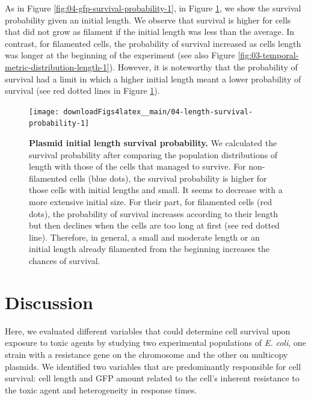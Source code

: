 \documentclass[a4paper, nobind]{templates/ociamthesis}
\begin{document}
As in Figure \ref{fig:04-gfp-survival-probability-1}, in Figure \ref{fig:04-length-survival-probability-1}, we show the survival probability given an initial length.
We observe that survival is higher for cells that did not grow as filament if the initial length was less than the average.
In contrast, for filamented cells, the probability of survival increased as cells length was longer at the beginning of the experiment (see also Figure \ref{fig:03-temporal-metric-distribution-length-1}).
However, it is noteworthy that the probability of survival had a limit in which a higher initial length meant a lower probability of survival (see red dotted lines in Figure \ref{fig:04-length-survival-probability-1}).





\begin{figure}[H]
\texttt{[image: downloadFigs4latex\_\_main/04-length-survival-probability-1]} \caption[Plasmid initial length survival probability.]{\textbf{Plasmid initial length survival probability.} We calculated the survival probability after comparing the population distributions of length with those of the cells that managed to survive. For non-filamented cells (blue dots), the survival probability is higher for those cells with initial lengths and small. It seems to decrease with a more extensive initial size. For their part, for filamented cells (red dots), the probability of survival increases according to their length but then declines when the cells are too long at first (see red dotted line). Therefore, in general, a small and moderate length or an initial length already filamented from the beginning increases the chances of survival.}\label{fig:04-length-survival-probability-1}
\end{figure}

\hypertarget{discussion}{%
\section{Discussion}\label{discussion}}

Here, we evaluated different variables that could determine cell survival upon exposure to toxic agents by studying two experimental populations of \emph{E. coli}, one strain with a resistance gene on the chromosome and the other on multicopy plasmids.
We identified two variables that are predominantly responsible for cell survival: cell length and GFP amount related to the cell's inherent resistance to the toxic agent and heterogeneity in response times.
\end{document}
